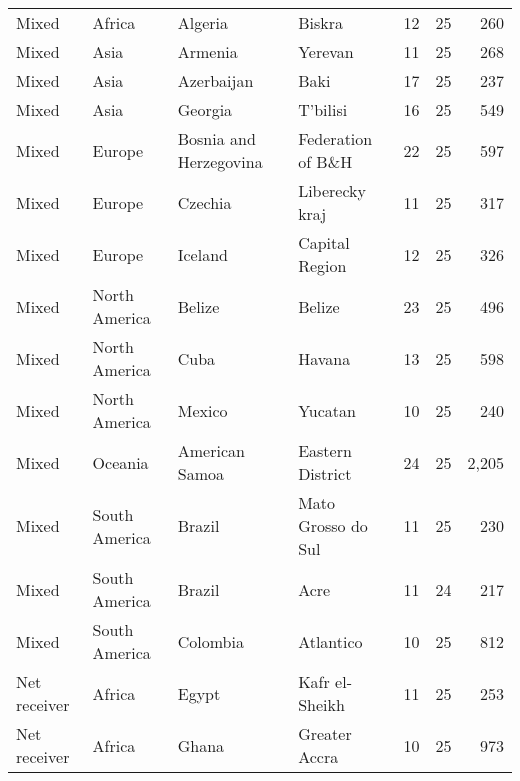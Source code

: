 \begin{tabular}{llllrrr}
 Mixed            & Africa        & Algeria                & Biskra             &             12 &          25 &          260 \\
 Mixed            & Asia          & Armenia                & Yerevan            &             11 &          25 &          268 \\
 Mixed            & Asia          & Azerbaijan             & Baki               &             17 &          25 &          237 \\
 Mixed            & Asia          & Georgia                & T'bilisi           &             16 &          25 &          549 \\
 Mixed            & Europe        & Bosnia and Herzegovina & Federation of B\&H  &             22 &          25 &          597 \\
 Mixed            & Europe        & Czechia                & Liberecky kraj     &             11 &          25 &          317 \\
 Mixed            & Europe        & Iceland                & Capital Region     &             12 &          25 &          326 \\
 Mixed            & North America & Belize                 & Belize             &             23 &          25 &          496 \\
 Mixed            & North America & Cuba                   & Havana             &             13 &          25 &          598 \\
 Mixed            & North America & Mexico                 & Yucatan            &             10 &          25 &          240 \\
 Mixed            & Oceania       & American Samoa         & Eastern District   &             24 &          25 &        2,205 \\
 Mixed            & South America & Brazil                 & Mato Grosso do Sul &             11 &          25 &          230 \\
 Mixed            & South America & Brazil                 & Acre               &             11 &          24 &          217 \\
 Mixed            & South America & Colombia               & Atlantico          &             10 &          25 &          812 \\
 Net receiver     & Africa        & Egypt                  & Kafr el-Sheikh     &             11 &          25 &          253 \\
 Net receiver     & Africa        & Ghana                  & Greater Accra      &             10 &          25 &          973 \\

\end{tabular}
